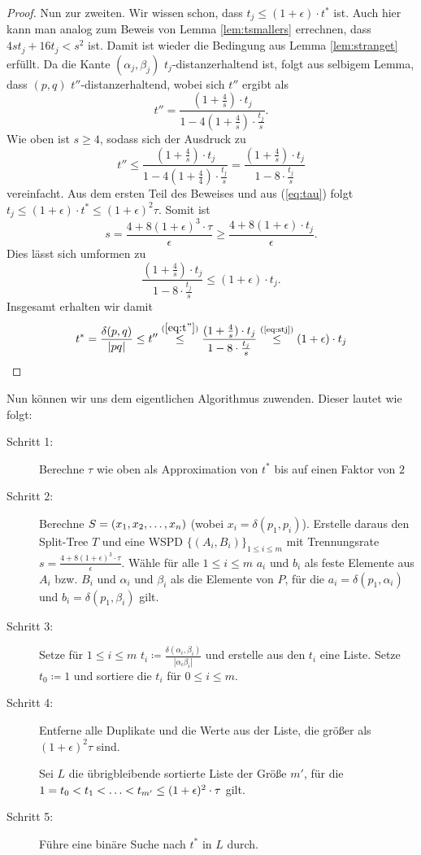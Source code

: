 \begin{proof}
	Nun zur zweiten. 
	Wir wissen schon, dass $t_j \leq (1 + \epsilon) \cdot t^*$ ist.
	Auch hier kann man analog zum Beweis von Lemma \ref{lem:tsmallers} errechnen, dass $4st_j + 16t_j < s^2$ ist. Damit ist wieder die Bedingung aus Lemma \ref{lem:stranget} erfüllt. Da die Kante $(\alpha_j, \beta_j)$ $t_j$-distanzerhaltend ist, folgt aus selbigem Lemma, dass $(p, q)$ $t''$-distanzerhaltend, wobei sich $t''$ ergibt als
	\[
	t'' = \frac{(1 + \frac{4}{s})\cdot t_j}{1 - 4 (1 + \frac{4}{s}) \cdot \frac{t_j}{s}}.
	\]
	Wie oben ist $s \geq 4$, sodass sich der Ausdruck zu 
	\[
	\label{eq:t''}
	t'' \leq \frac{(1 + \frac{4}{s})\cdot t_j}{1 - 4 (1 + \frac{4}{4}) \cdot \frac{t_j}{s}}
	= \frac{(1 + \frac{4}{s})\cdot t_j}{1 - 8 \cdot \frac{t_j}{s}} \tag{3}
	\]
	vereinfacht.
	Aus dem ersten Teil des Beweises und aus (\ref{eq:tau}) folgt $t_j \leq (1 + \epsilon) \cdot t^* \leq (1 + \epsilon)^2 \tau$. Somit ist
	\[
	s = \frac{4 + 8(1 + \epsilon)^3 \cdot \tau}{\epsilon} 
	\geq \frac{4 + 8 (1 + \epsilon) \cdot t_j}{\epsilon}. 
	\]
	Dies lässt sich umformen zu  
	\[
	\label{eq:stj}
	\frac{(1 + \frac{4}{s})\cdot t_j}{1 - 8 \cdot \frac{t_j}{s}} \leq (1 + \epsilon) \cdot t_j. \tag{4}
	\]
	Insgesamt erhalten wir damit \[
		t^* = \frac{\delta(p, q)}{|pq|} 
		\leq t''
		\stackrel{(\ref{eq:t''})}{\leq} \frac{(1 + \frac{4}{s})\cdot t_j}{1 - 8 \cdot \frac{t_j}{s}}
		\stackrel{\text{(\ref{eq:stj})}}{\leq} (1 + \epsilon)\cdot t_j
	\]
\end{proof}

Nun können wir uns dem eigentlichen Algorithmus zuwenden. Dieser lautet wie folgt:

\begin{description}
	\item[Schritt 1:] Berechne $\tau$ wie oben als Approximation von $t^*$ bis auf einen Faktor von $2$
	
	\item[Schritt 2:] Berechne $S = (x_1, x_2, \mathellipsis, x_n)$ (wobei $x_i = \delta(p_1, p_i)$). 
	Erstelle daraus den Split-Tree $T$ und eine WSPD $\{(A_i, B_i)\}_{1 \leq i \leq m}$ mit Trennungsrate $s = \frac{4 + 8(1 + \epsilon)^3 \cdot \tau}{\epsilon}$. 
	Wähle für alle $1 \leq i \leq m$ $a_i$ und $b_i$ als feste Elemente aus $A_i$ bzw. $B_i$ und $\alpha_i$ und $\beta_i$ als die Elemente von $P$, für die $a_i = \delta(p_1, \alpha_i)$ und $b_i = \delta(p_1, \beta_i)$ gilt.
	
	\item[Schritt 3:] Setze für $1 \leq i \leq m$ $t_i \coloneqq \frac{\delta(\alpha_i, \beta_i)}{|\alpha_i \beta_i|}$ und erstelle aus den $t_i$ eine Liste. Setze $t_0 \coloneqq 1$ und sortiere die $t_i$ für $0 \leq i \leq m$.
	
	\item[Schritt 4:] Entferne alle Duplikate und die Werte aus der Liste, die größer als $(1 + \epsilon)^2 \tau$ sind.
	
	Sei $L$ die übrigbleibende sortierte Liste der Größe $m'$, für die $1 = t_0 < t_1 < \mathellipsis < t_{m'} \leq (1 + \epsilon)^2\cdot \tau$ gilt.
	
	\item[Schritt 5:] Führe eine binäre Suche nach $t^*$ in $L$ durch.
\end{description}

